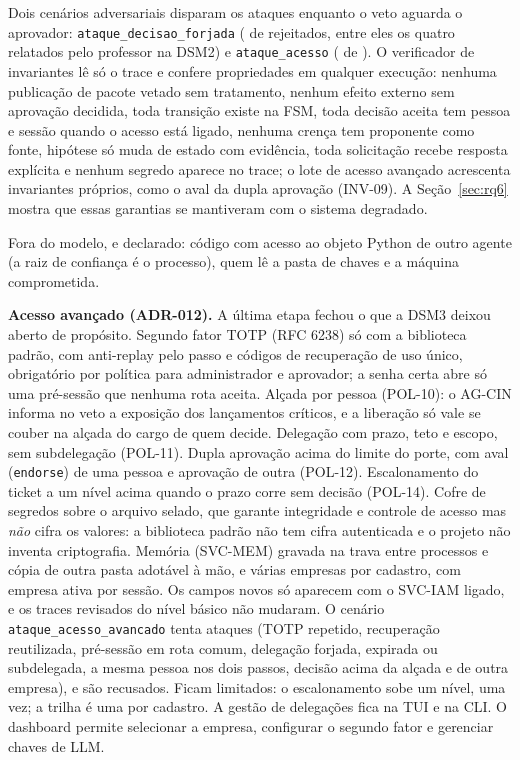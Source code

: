 \documentclass[10pt,a4paper]{article}
\newcommand{\code}[1]{\texttt{#1}}
\begin{document}
Dois cenários adversariais disparam os ataques enquanto o veto aguarda o aprovador: \code{ataque\_decisao\_forjada}
( de  rejeitados, entre eles os quatro relatados pelo professor
na DSM2) e \code{ataque\_acesso} ( de ). O verificador de invariantes lê
só o trace e confere  propriedades em qualquer execução: nenhuma publicação de pacote vetado sem
tratamento, nenhum efeito externo sem aprovação decidida, toda transição existe na FSM, toda decisão aceita tem pessoa e
sessão quando o acesso está ligado, nenhuma crença tem proponente como fonte, hipótese só muda de estado com evidência,
toda solicitação recebe resposta explícita e nenhum segredo aparece no trace; o lote de acesso avançado acrescenta
invariantes próprios, como o aval da dupla aprovação (INV-09). A Seção~\ref{sec:rq6} mostra que essas
garantias se mantiveram com o sistema degradado.

Fora do modelo, e declarado: código com acesso ao objeto Python de outro agente (a raiz de confiança é o processo),
quem lê a pasta de chaves e a máquina comprometida.

\textbf{Acesso avançado (ADR-012).} A última etapa fechou o que a DSM3 deixou aberto de propósito. Segundo fator
TOTP (RFC 6238) só com a biblioteca padrão, com anti-replay pelo passo e códigos de recuperação de uso único,
obrigatório por política para administrador e aprovador; a senha certa abre só uma pré-sessão que nenhuma rota aceita.
Alçada por pessoa (POL-10): o AG-CIN informa no veto a exposição dos lançamentos críticos, e a liberação só vale se
couber na alçada do cargo de quem decide. Delegação com prazo, teto e escopo, sem subdelegação (POL-11). Dupla
aprovação acima do limite do porte, com aval (\code{endorse}) de uma pessoa e aprovação de outra (POL-12). Escalonamento
do ticket a um nível acima quando o prazo corre sem decisão (POL-14). Cofre de segredos sobre o arquivo selado, que
garante integridade e controle de acesso mas \emph{não} cifra os valores: a biblioteca padrão não tem cifra autenticada
e o projeto não inventa criptografia. Memória (SVC-MEM) gravada na trava entre processos e cópia de outra pasta
adotável à mão, e várias empresas por cadastro, com empresa ativa por sessão. Os campos novos só aparecem com o SVC-IAM
ligado, e os traces revisados do nível básico não mudaram. O cenário \code{ataque\_acesso\_avancado} tenta
 ataques (TOTP repetido, recuperação reutilizada, pré-sessão em rota comum, delegação
forjada, expirada ou subdelegada, a mesma pessoa nos dois passos, decisão acima da alçada e de outra empresa), e
 são recusados. Ficam limitados: o escalonamento sobe um nível, uma vez; a trilha
é uma por cadastro. A gestão de delegações fica na TUI e na CLI. O dashboard permite selecionar a empresa, configurar o segundo fator e gerenciar chaves de LLM.
\end{document}
